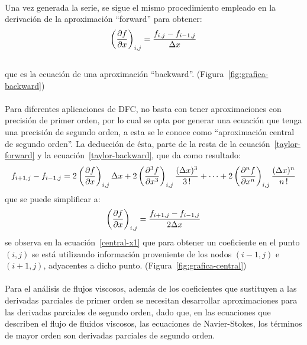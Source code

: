 \documentclass[letterpaper, openright, 12pt]{book}
\begin{document}
\paragraph{}
    Una vez generada la serie, se sigue el mismo procedimiento empleado en la
    derivación de la aproximación ``forward'' para obtener:
    \begin{equation}
    \left( \pdv{f}{x} \right)_{i,j} = \frac{f_{i,j} - f_{i-1,j}}{\Delta x}
    \label{backward-x1}
    \end{equation}
    \\que es la ecuación de una aproximación ``backward''. (Figura~\ref{fig:grafica-backward})

    \paragraph*{}
    Para diferentes aplicaciones de DFC, no basta con tener aproximaciones con
    precisión de primer orden, por lo cual se opta por generar una ecuación que
    tenga una precisión de segundo orden, a esta se le conoce como
    ``aproximación central de segundo orden''. La deducción de ésta, parte de la
    resta de la ecuación~\ref{taylor-forward} y la ecuación~\ref{taylor-backward},
    que da como resultado:
    \begin{equation}
    f_{i+1,j} - f_{i-1, j} = 2 \left( \pdv{f}{x} \right)_{i,j} \Delta x + 2 \left( \pdv[3]{f}{x} \right)_{i,j} \frac{(\Delta x)^3}{3 \,!} + \dotsb + 2 \left( \pdv[n]{f}{x} \right)_{i,j} \frac{(\Delta x)^n}{n\,!}
    \end{equation}
    que se puede simplificar a:\\
    \begin{equation}
    \left( \pdv{f}{x} \right)_{i,j} = \frac{f_{i+1,j} - f_{i-1,j}}{2 \Delta x}
    \label{central-x1}
    \end{equation}
    se observa en la ecuación~\ref{central-x1} que para obtener un coeficiente
    en el punto $(i,j)$ se está utilizando información proveniente de los nodos
    $(i-1, j)$ e $(i+1, j)$, adyacentes a dicho punto. (Figura~\ref{fig:grafica-central})

    \paragraph*{}
    Para el análisis de flujos viscosos, además de los coeficientes que sustituyen
    a las derivadas parciales de primer orden se necesitan desarrollar
    aproximaciones para las derivadas parciales de segundo orden, dado que, en
    las ecuaciones que describen el flujo de fluidos viscosos, las ecuaciones de
    Navier-Stokes, los términos de mayor orden son derivadas parciales de
    segundo orden.
\end{document}
